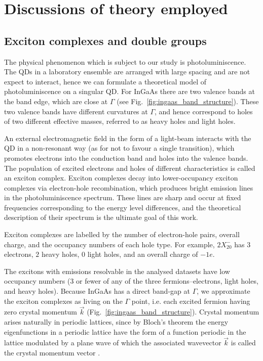 \section{Discussions of theory employed}

\subsection[Exciton complexes]{Exciton complexes and double groups} \label{sec:exciton_theory}
The physical phenomenon which is subject to our study is photoluminiscence. The QDs in a laboratory ensemble are arranged with large spacing and are not expect to interact, hence we can formulate a theoretical model of photoluminiscence on a singular QD. For InGaAs there are two valence bands at the band edge, which are close at $\Gamma$ (see Fig.~\ref{fig:ingaas_band_structure}). These two valence bands have different curvatures at $\Gamma$, and hence correspond to holes of two different effective masses, referred to as heavy holes and light holes.

An external electromagnetic field in the form of a light-beam interacts with the QD in a non-resonant way (as for not to favour a single transition), which promotes electrons into the conduction band and holes into the valence bands. The population of excited electrons and holes of different characteristics is called an exciton complex. Exciton complexes decay into lower-occupancy exciton complexes via electron-hole recombination, which produces bright emission lines in the photoluminiscence spectrum. These lines are sharp and occur at fixed frequencies corresponding to the energy level differences, and the theoretical description of their spectrum is the ultimate goal of this work.

Exciton complexes are labelled by the number of electron-hole pairs, overall charge, and the occupancy numbers of each hole type. For example, $2X^-_{20}$ has $3$ electrons, $2$ heavy holes, $0$ light holes, and an overall charge of $-1e$.

The excitons with emissions resolvable in the analysed datasets have low occupancy numbers (3 or fewer of any of the three fermions--electrons, light holes, and heavy holes). Because InGaAs has a direct band-gap at $\Gamma$, we approximate the exciton complexes as living on the $\Gamma$ point, i.e. each excited fermion having zero crystal momentum $\vec{k}$ (Fig.~\ref{fig:ingaas_band_structure}). Crystal momentum arises naturally in periodic lattices, since by Bloch's theorem the energy eigenfunctions in a periodic lattice have the form of a function periodic in the lattice modulated by a plane wave of which the associated wavevector $\vec{k}$ is called the crystal momentum vector \cite[Ch.~2.2]{singh}.


